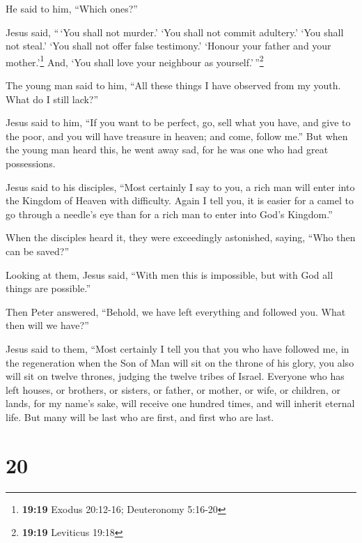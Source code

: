  He said to him, ``Which ones?''

Jesus said, ``\,`You shall not murder.' `You shall not commit adultery.'
`You shall not steal.' `You shall not offer false testimony.'
 `Honour your father and your mother.'\footnote{\textbf{19:19}
  Exodus 20:12-16; Deuteronomy 5:16-20} And, `You shall love your
neighbour as yourself.'\,''\footnote{\textbf{19:19} Leviticus 19:18}

 The young man said to him, ``All these things I have
observed from my youth. What do I still lack?''

 Jesus said to him, ``If you want to be perfect, go, sell
what you have, and give to the poor, and you will have treasure in
heaven; and come, follow me.''  But when the young man
heard this, he went away sad, for he was one who had great possessions.

 Jesus said to his disciples, ``Most certainly I say to
you, a rich man will enter into the Kingdom of Heaven with difficulty.
 Again I tell you, it is easier for a camel to go through
a needle's eye than for a rich man to enter into God's Kingdom.''

 When the disciples heard it, they were exceedingly
astonished, saying, ``Who then can be saved?''

 Looking at them, Jesus said, ``With men this is
impossible, but with God all things are possible.''

 Then Peter answered, ``Behold, we have left everything
and followed you. What then will we have?''

 Jesus said to them, ``Most certainly I tell you that you
who have followed me, in the regeneration when the Son of Man will sit
on the throne of his glory, you also will sit on twelve thrones, judging
the twelve tribes of Israel.  Everyone who has left
houses, or brothers, or sisters, or father, or mother, or wife, or
children, or lands, for my name's sake, will receive one hundred times,
and will inherit eternal life.  But many will be last who
are first, and first who are last.

\hypertarget{section-19}{%
\section{20}\label{section-19}}

